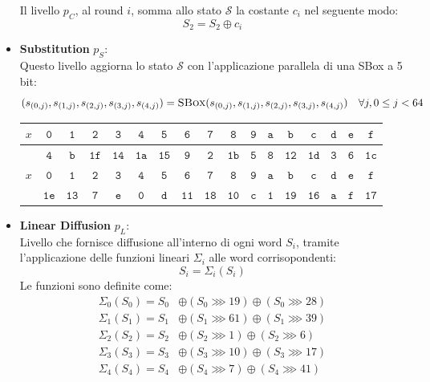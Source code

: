 \documentclass[target=bach,aauheader=,style=]{thud}
\begin{document}
\begin{itemize}
				Il livello $p_C$, al round $i$, somma allo stato $\mathcal{S}$ la costante $c_i$ nel seguente modo:
				\[S_2 = S_2 \oplus c_i\]
				\item \textbf{Substitution} $p_S$:\\
				Questo livello aggiorna lo stato $\mathcal{S}$ con l'applicazione parallela di una SBox a 5 bit:
				\[(s_{(0,j)}, s_{(1,j)}, s_{(2,j)}, s_{(3,j)}, s_{(4,j)}) = \Call{SBox}{s_{(0,j)}, s_{(1,j)}, s_{(2,j)}, s_{(3,j)}, s_{(4,j)}} \quad \forall j, 0 \le j < 64\]
				\begin{center}
					\begin{tabular}{|c||c|c|c|c|c|c|c|c|c|c|c|c|c|c|c|c|}
						\hline
						$x$ & $\mathtt{0}$ & $\mathtt{1}$ & $\mathtt{2}$ & $\mathtt{3}$ & $\mathtt{4}$ & $\mathtt{5}$ & $\mathtt{6}$ & $\mathtt{7}$ & $\mathtt{8}$ & $\mathtt{9}$ &$\mathtt{a}$ & $\mathtt{b}$ & $\mathtt{c}$ & $\mathtt{d}$ & $\mathtt{e}$ & $\mathtt{f}$ \\
						\hline
						\Call{Sbox}{$x$} & $\mathtt{4}$ & $\mathtt{b}$ & $\mathtt{1f}$ & $\mathtt{14}$ & $\mathtt{1a}$ & $\mathtt{15}$ & $\mathtt{9}$ & $\mathtt{2}$ & $\mathtt{1b}$ & $\mathtt{5}$ & $\mathtt{8}$ & $\mathtt{12}$ & $\mathtt{1d}$ & $\mathtt{3}$& $\mathtt{6}$& $\mathtt{1c}$\\
						\hline
						\hline
						$x$ & $\mathtt{0}$ & $\mathtt{1}$ & $\mathtt{2}$ & $\mathtt{3}$ & $\mathtt{4}$ & $\mathtt{5}$ & $\mathtt{6}$ & $\mathtt{7}$ & $\mathtt{8}$ & $\mathtt{9}$ &$\mathtt{a}$ & $\mathtt{b}$ & $\mathtt{c}$ & $\mathtt{d}$ & $\mathtt{e}$ & $\mathtt{f}$ \\
						\hline
						\Call{Sbox}{$x$} & $\mathtt{1e}$ & $\mathtt{13}$ & $\mathtt{7}$ & $\mathtt{e}$ & $\mathtt{0}$ & $\mathtt{d}$ & $\mathtt{11}$ & $\mathtt{18}$ & $\mathtt{10}$ & $\mathtt{c}$ & $\mathtt{1}$ & $\mathtt{19}$ & $\mathtt{16}$ & $\mathtt{a}$& $\mathtt{f}$& $\mathtt{17}$\\
						\hline
					\end{tabular}
				\end{center}
				\item \textbf{Linear Diffusion} $p_L$:\\
				Livello che fornisce diffusione all'interno di ogni word $S_i$, tramite l'applicazione delle funzioni lineari $\Sigma_i$ alle word corrisopondenti:
				\[S_i = \Sigma_i(S_i)\]
				Le funzioni sono definite come:
				\begin{align*}
					\Sigma_{0}(S_0) = S_0 &\oplus (S_0 \ggg 19) \oplus (S_0 \ggg 28)\\
					\Sigma_{1}(S_1) = S_1 &\oplus (S_1 \ggg 61) \oplus (S_1 \ggg 39)\\
					\Sigma_{2}(S_2) = S_2 &\oplus (S_2 \ggg 1) \oplus (S_2 \ggg 6)\\
					\Sigma_{3}(S_3) = S_3 &\oplus (S_3 \ggg 10) \oplus (S_3 \ggg 17)\\
					\Sigma_{4}(S_4) = S_4 &\oplus (S_4 \ggg 7) \oplus (S_4 \ggg 41)
				\end{align*}
			\end{itemize}
\end{document}
